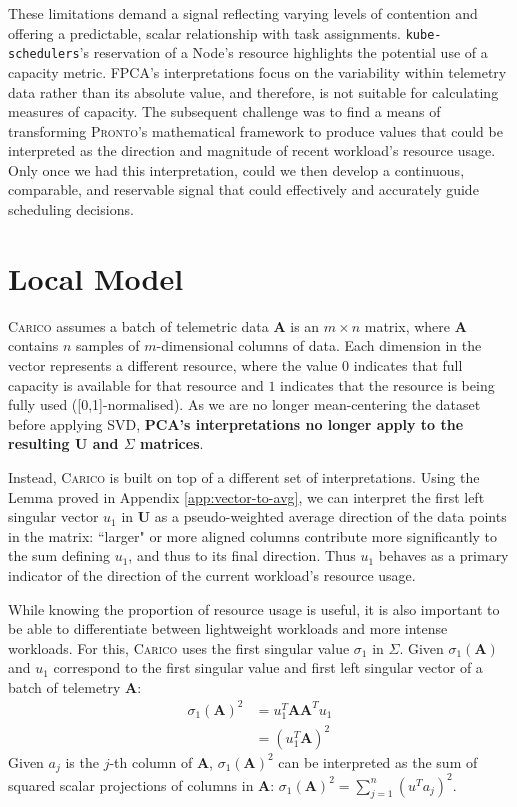 These limitations demand a signal reflecting varying levels of contention
and offering a predictable, scalar relationship with task assignments.
\texttt{kube-schedulers}'s reservation of a Node's resource highlights the
potential use of a capacity metric. FPCA's interpretations focus on the
variability within telemetry data rather than its absolute value, and therefore,
is not suitable for calculating measures of capacity. The subsequent
challenge was to find a means of transforming \textsc{Pronto}'s mathematical
framework to produce values that could be interpreted as the direction and
magnitude of recent workload's resource usage. Only once we had this
interpretation, could we then develop a continuous, comparable, and reservable
signal that could effectively and accurately guide scheduling decisions.

\section{Local Model}
\label{sec:local-model-construction}
\textsc{Carico} assumes a batch of telemetric data $\mathbf{A}$ is an $m \times
n$ matrix, where $\mathbf{A}$ contains $n$ samples of $m$-dimensional columns of
data. Each dimension in the vector represents a different resource, where the
value $0$ indicates that full capacity is available for that resource and $1$
indicates that the resource is being fully used ([0,1]-normalised). As we
are no longer mean-centering the dataset before applying SVD, \textbf{PCA's
interpretations no longer apply to the resulting $\mathbf{U}$ and $\Sigma$
matrices}.

Instead, \textsc{Carico} is built on top of  a different set of interpretations.
Using the Lemma proved in Appendix \ref{app:vector-to-avg}, we can interpret the
first left singular vector $u_1$ in $\mathbf{U}$ as a pseudo-weighted average
direction of the data points in the matrix: ``larger" or more aligned columns
contribute more significantly to the sum defining $u_1$, and thus to its final
direction. Thus $u_1$ behaves as a primary indicator of the direction of the
current workload's resource usage.

While knowing the proportion of resource usage is useful, it is also important
to be able to differentiate between lightweight workloads and more intense
workloads. For this, \textsc{Carico} uses the first singular value $\sigma_1$ in
$\Sigma$. Given $\sigma_1(\mathbf{A})$ and $u_1$ correspond to the first
singular value and first left singular vector of a batch of telemetry
$\mathbf{A}$:
\begin{align}
    \sigma_1(\mathbf{A})^2 &= u_1^T \mathbf{AA}^T u_1 \\
    &= (u_1^T \mathbf{A})^2
\end{align}
Given $a_j$ is the $j$-th column of $\mathbf{A}$, $\sigma_1(\mathbf{A})^2$ can be
interpreted as the sum of squared scalar projections of columns in $\mathbf{A}$:
$\sigma_1(\mathbf{A})^2 = \sum_{j=1}^n (u^T a_j)^2$.

